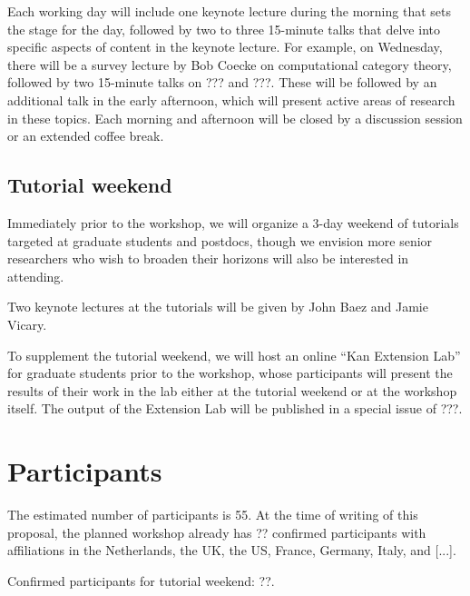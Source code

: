 \documentclass{article}
\newcommand{\redout}[1]{{\color{red}#1}}
\begin{document}
Each working day will include one keynote lecture during the morning that sets the stage for the day, followed by two to three 15-minute talks that delve into specific aspects of content in the keynote lecture. For example, on Wednesday, there will be a survey lecture by \redout{Bob Coecke} on computational category theory, followed by two 15-minute talks on \redout{???} and \redout{???}. These will be followed by an additional talk in the early afternoon, which will present active areas of research in these topics. Each morning and afternoon will be closed by a discussion session or an extended coffee break.


\subsection{Tutorial weekend}
Immediately prior to the workshop, we will organize a 3-day weekend of tutorials targeted at graduate students and postdocs, though we envision more senior researchers who wish to broaden their horizons will also be interested in attending.

Two keynote lectures at the tutorials will be given by \redout{John Baez and Jamie Vicary}.

To supplement the tutorial weekend, we will host an online ``Kan Extension Lab'' for graduate students prior to the workshop, whose participants will present the results of their work in the lab either at the tutorial weekend or at the workshop itself. The output of the Extension Lab will be published in a special issue of \redout{???}.

\section{Participants}
The estimated number of participants is 55. At the time of writing of this proposal, the planned workshop already has ?? confirmed participants with affiliations in the Netherlands, the UK, the US, France, Germany, Italy, and [...].

Confirmed participants for tutorial weekend: \redout{??}. 
\end{document}
